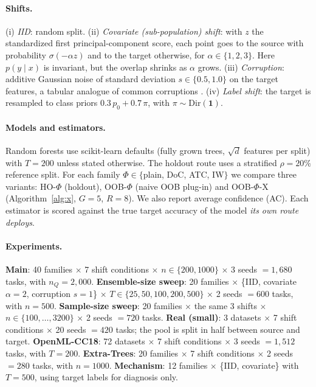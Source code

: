\paragraph{Shifts.}
(i) \emph{IID}: random split.
(ii) \emph{Covariate (sub-population) shift}: with $z$ the standardized first principal-component score, each point goes to the source with probability $\sigma(-\alpha z)$ and to the target otherwise, for $\alpha\in\{1,2,3\}$. Here $p(y\mid x)$ is invariant, but the overlap shrinks as $\alpha$ grows.
(iii) \emph{Corruption}: additive Gaussian noise of standard deviation $s\in\{0.5,1.0\}$ on the target features, a tabular analogue of common corruptions \citep{hendrycks2019corruptions}.
(iv) \emph{Label shift}: the target is resampled to class priors $0.3\,p_0+0.7\,\pi$, with $\pi\sim\mathrm{Dir}(\bm 1)$.

\paragraph{Models and estimators.}
Random forests use scikit-learn defaults (fully grown trees, $\sqrt d$ features per split) with $T=200$ unless stated otherwise. The holdout route uses a stratified $\rho=20\%$ reference split. For each family $\Phi\in\{$plain, DoC, ATC, IW$\}$ we compare three variants: HO-$\Phi$ (holdout), OOB-$\Phi$ (naive OOB plug-in) and OOB-$\Phi$-X (Algorithm~\ref{alg:x}, $G=5$, $R=8$). We also report average confidence (AC). Each estimator is scored against the true target accuracy of the model \emph{its own route deploys}.

\paragraph{Experiments.}
\textbf{Main}: 40 families $\times$ 7 shift conditions $\times$ $n\in\{200,1000\}$ $\times$ 3 seeds $=1{,}680$ tasks, with $n_Q=2{,}000$.
\textbf{Ensemble-size sweep}: 20 families $\times$ \{IID, covariate $\alpha{=}2$, corruption $s{=}1$\} $\times$ $T\in\{25,50,100,200,500\}$ $\times$ 2 seeds $=600$ tasks, with $n=500$.
\textbf{Sample-size sweep}: 20 families $\times$ the same 3 shifts $\times$ $n\in\{100,\dots,3200\}$ $\times$ 2 seeds $=720$ tasks.
\textbf{Real (small)}: 3 datasets $\times$ 7 shift conditions $\times$ 20 seeds $=420$ tasks; the pool is split in half between source and target.
\textbf{OpenML-CC18}: 72 datasets $\times$ 7 shift conditions $\times$ 3 seeds $=1{,}512$ tasks, with $T=200$.
\textbf{Extra-Trees}: 20 families $\times$ 7 shift conditions $\times$ 2 seeds $=280$ tasks, with $n=1000$.
\textbf{Mechanism}: 12 families $\times$ \{IID, covariate\} with $T=500$, using target labels for diagnosis only.

